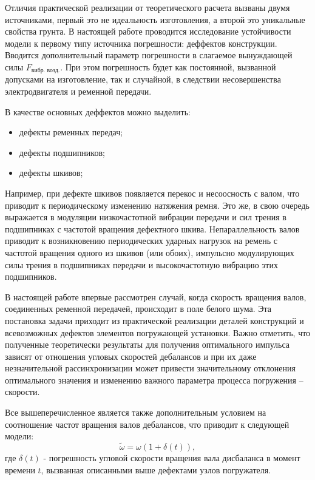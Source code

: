 Отличия практической реализации от теоретического расчета вызваны двумя источниками, первый это не идеальность изготовления,
а второй это уникальные свойства грунта. В настоящей работе проводится исследование устойчивости модели к первому типу
источника погрешности: деффектов конструкции. Вводится дополнительный параметр погрешности в слагаемое вынуждающей силы
$F_{\text{вибр. возд.}}$. При этом погрешность будет как постоянной, вызванной допусками на изготовление, так и случайной,
в следствии несовершенства электродвигателя и ременной передачи.

В качестве основных деффектов можно выделить:
\begin{itemize}
    \item дефекты ременных передач;
    \item дефекты подшипников;
    \item дефекты шкивов;
\end{itemize}
Например, при дефекте шкивов появляется перекос и несоосность с валом, что приводит к периодическому изменению натяжения ремня.
Это же, в свою очередь выражается в модуляции низкочастотной вибрации передачи и сил трения в подшипниках с частотой вращения дефектного шкива.
Непараллельность валов приводит к возникновению периодических ударных нагрузок на ремень с частотой вращения одного из шкивов (или обоих),
импульсно модулирующих силы трения в подшипниках передачи и высокочастотную вибрацию этих подшипников.

В настоящей работе впервые рассмотрен случай, когда скорость вращения валов, соединенных ременной передачей, происходит в поле белого шума.
Эта постановка задачи приходит из практической реализации деталей конструкций и всевозможных дефектов элементов погружающей установки.
Важно отметить, что полученные теоретически результаты для получения оптимального импульса зависят от отношения угловых скоростей дебалансов
и при их даже незначительной рассинхронизации может привести значительному отклонения оптимального значения и изменению важного параметра
процесса погружения – скорости.

Все вышеперечисленное является также дополнительным условием на соотношение частот вращения валов дебалансов,
что приводит к следующей модели:
\begin{equation}
    \widetilde{\omega} = \omega (1 + \delta(t)),
\end{equation}
где $\delta(t)$ - погрешность угловой скорости вращения вала дисбаланса в момент времени $t$, вызванная описанными выше дефектами узлов погружателя.

